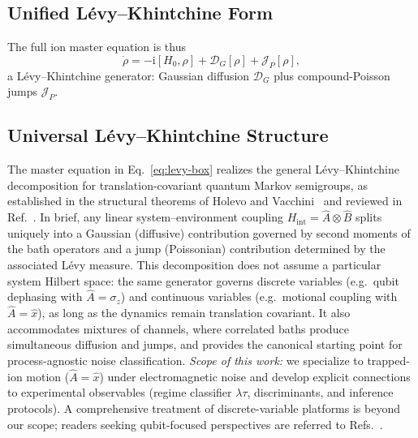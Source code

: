 \subsection{Unified Lévy–Khintchine Form}
The full ion master equation is thus
\begin{equation}
\dot{\rho} = -\mathrm{i}[H_0,\rho] + \mathcal{D}_G[\rho] + \mathcal{J}_P[\rho],
\label{eq:levy-box}
\end{equation}
a Lévy–Khintchine generator: Gaussian diffusion $\mathcal{D}_G$ plus compound-Poisson jumps $\mathcal{J}_P$.

\subsection{Universal L\'evy--Khintchine Structure}
\label{subsec:universal-LK}
The master equation in Eq.~\eqref{eq:levy-box} realizes the general L\'evy--Khintchine decomposition for translation-covariant quantum Markov semigroups, as established in the structural theorems of Holevo and Vacchini~\cite{Holevo1993,VacchiniJMathPhys2001} and reviewed in Ref.~\cite{BreuerPetruccione2002}.
In brief, any linear system--environment coupling $H_{\text{int}}=\hat{A}\otimes\hat{B}$ splits uniquely into a Gaussian (diffusive) contribution governed by second moments of the bath operators and a jump (Poissonian) contribution determined by the associated L\'evy measure.
This decomposition does not assume a particular system Hilbert space: the same generator governs discrete variables (e.g.~qubit dephasing with $\hat{A}=\sigma_z$) and continuous variables (e.g.~motional coupling with $\hat{A}=\hat{x}$), as long as the dynamics remain translation covariant.
It also accommodates mixtures of channels, where correlated baths produce simultaneous diffusion and jumps, and provides the canonical starting point for process-agnostic noise classification.
\emph{Scope of this work:} we specialize to trapped-ion motion ($\hat{A}=\hat{x}$) under electromagnetic noise and develop explicit connections to experimental observables (regime classifier $\lambda\tau$, discriminants, and inference protocols).
A comprehensive treatment of discrete-variable platforms is beyond our scope; readers seeking qubit-focused perspectives are referred to Refs.~\cite{Paladino2014,Cywinski2008}.

